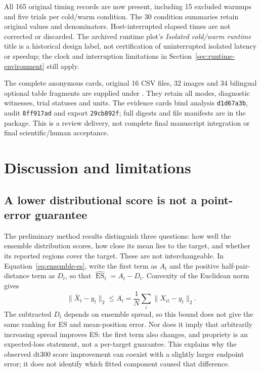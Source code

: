 \documentclass[11pt]{article}
\newcommand{\ES}{\operatorname{ES}}
\begin{document}
All 165 original timing records are now present, including 15 excluded
warmups and five trials per cold/warm condition. The 30 condition summaries
retain original values and denominators. Host-interrupted elapsed times
are not corrected or discarded. The archived runtime plot's
\emph{Isolated cold/warm runtime} title is a historical design label,
not certification of uninterrupted isolated latency or speedup;
the clock and interruption limitations in
Section~\ref{sec:runtime-environment} still apply.

The complete anonymous cards, original 16 CSV files, 32 images and 34
bilingual optional table fragments are supplied under
.
They retain all modes, diagnostic witnesses, trial statuses and units.
The evidence cards bind analysis \texttt{d1d67a3b}, audit
\texttt{8ff917ad} and export \texttt{29cb892f}; full digests and file
manifests are in the package. This is a review delivery, not complete
final manuscript integration or final scientific/human acceptance.
\FloatBarrier


\section{Discussion and limitations}
\subsection{A lower distributional score is not a point-error guarantee}
\label{sec:discussion-score}
The preliminary method results distinguish three questions: how well the
ensemble distribution scores, how close its mean lies to the target, and
whether its reported regions cover the target. These are not interchangeable.
In Equation~\eqref{eq:ensemble-es}, write the first term as $A_t$ and the
positive half-pair-distance term as $D_t$, so that
$\widehat{\ES}_t=A_t-D_t$. Convexity of the Euclidean norm gives
\begin{equation}
 \|\bar X_t-y_t\|_2\leq
 A_t=\frac1N\sum_i\|X_{it}-y_t\|_2.
 \label{eq:mean-error-bound}
\end{equation}
The subtracted $D_t$ depends on ensemble spread, so this bound does not give
the same ranking for ES and mean-position error. Nor does it imply that
arbitrarily increasing spread improves ES: the first term also changes,
and propriety is an expected-loss statement, not a per-target guarantee.
This explains why the observed dt300 score improvement can coexist with
a slightly larger endpoint error; it does not identify which fitted
component caused that difference.
\end{document}
